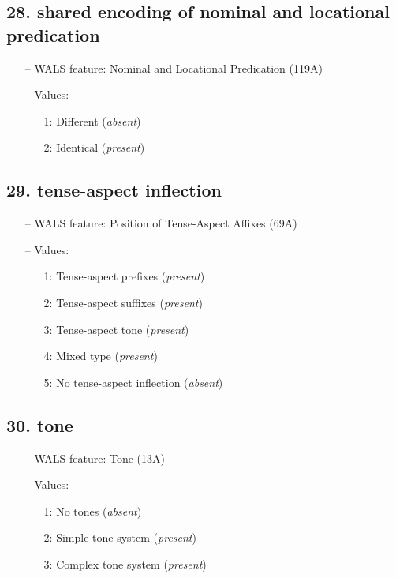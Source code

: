 \subsection*{28. shared encoding of nominal and locational predication}

\begin{itemize}
  \item[--] WALS feature: Nominal and Locational Predication (119A)
  \item[--] Values:
  {\small
  \begin{enumerate}
    \item[1:] Different (\emph{absent})
    \item[2:] Identical (\emph{present})
  \end{enumerate}
  }
\end{itemize}


\subsection*{29. tense-aspect inflection}

\begin{itemize}
  \item[--] WALS feature: Position of Tense-Aspect Affixes (69A)
  \item[--] Values:
  {\small
  \begin{enumerate}
    \item[1:] Tense-aspect prefixes (\emph{present})
    \item[2:] Tense-aspect suffixes (\emph{present})
    \item[3:] Tense-aspect tone (\emph{present})
    \item[4:] Mixed type (\emph{present})
    \item[5:] No tense-aspect inflection (\emph{absent})
  \end{enumerate}
  }
\end{itemize}


\subsection*{30. tone}

\begin{itemize}
  \item[--] WALS feature: Tone (13A)
  \item[--] Values:
  {\small
  \begin{enumerate}
    \item[1:] No tones (\emph{absent})
    \item[2:] Simple tone system (\emph{present})
    \item[3:] Complex tone system (\emph{present})
  \end{enumerate}
  }
\end{itemize}


